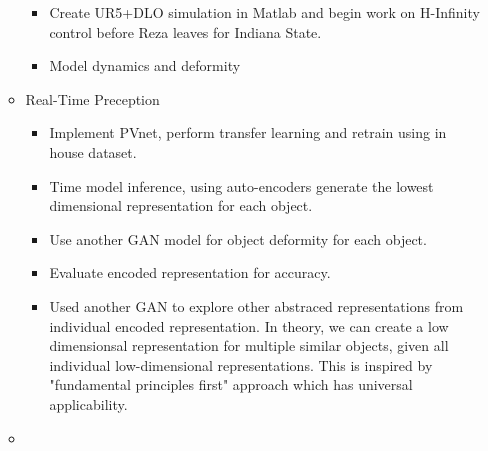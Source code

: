 \documentclass[11pt]{article}
\begin{document}
\begin{itemize}
\begin{itemize}
\begin{itemize}
            \item Create UR5+DLO simulation in Matlab and begin work on H-Infinity control before Reza leaves for Indiana State.
            \item Model dynamics and deformity
      \end{itemize}
      \item Real-Time Preception
      \begin{itemize}
        \item Implement PVnet, perform transfer learning and retrain using
        in house dataset.
        \item Time model inference, using auto-encoders generate the lowest
        dimensional representation for each object.
        \item Use another GAN model for object deformity for each object.
        \item Evaluate encoded representation for accuracy.
        \item Used another GAN to explore other abstraced representations from
        individual encoded representation. In theory, we can create a low
        dimensionsal representation for multiple similar objects, given all
        individual low-dimensional representations. This is inspired by "fundamental
        principles first" approach which has universal applicability.
      \end{itemize}
      \item
  \end{itemize}
\end{itemize}
\end{document}
